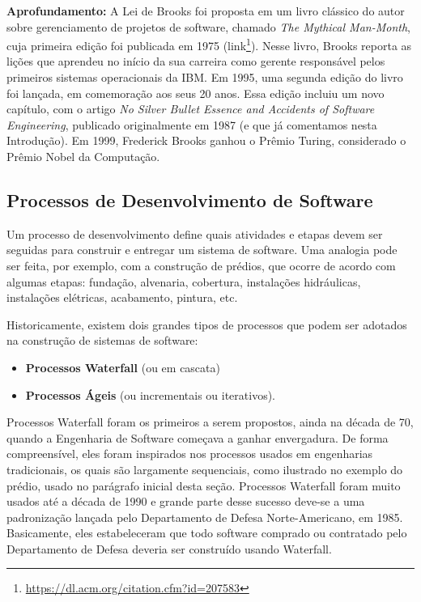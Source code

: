 \documentclass[
  11pt,
  twoside]{book}
\DeclareRobustCommand{\href}[2]{#2\footnote{\url{#1}}}
\newenvironment{esmbox}{\centering \vspace{1.5ex} \begin{tcolorbox}[breakable, colback=backcolor, width=4.9in]}{\end{tcolorbox} \vspace{1.5ex}}
\begin{document}
\begin{esmbox}

\textbf{Aprofundamento:} A Lei de Brooks foi proposta em um livro
clássico do autor sobre gerenciamento de projetos de software, chamado
\emph{The Mythical Man-Month}, cuja primeira edição foi publicada em
1975 (\href{https://dl.acm.org/citation.cfm?id=207583}{link}). Nesse
livro, Brooks reporta as lições que aprendeu no início da sua carreira
como gerente responsável pelos primeiros sistemas operacionais da IBM.
Em 1995, uma segunda edição do livro foi lançada, em comemoração aos
seus 20 anos. Essa edição incluiu um novo capítulo, com o artigo
\emph{No Silver Bullet Essence and Accidents of Software Engineering},
publicado originalmente em 1987 (e que já comentamos nesta Introdução).
Em 1999, Frederick Brooks ganhou o Prêmio Turing, considerado o Prêmio
Nobel da Computação.

\end{esmbox}

\hypertarget{processos-de-desenvolvimento-de-software}{%
\subsection{Processos de Desenvolvimento de
Software}\label{processos-de-desenvolvimento-de-software}}

 Um processo de desenvolvimento define
quais atividades e etapas devem ser seguidas para construir e entregar
um sistema de software. Uma analogia pode ser feita, por exemplo, com a
construção de prédios, que ocorre de acordo com algumas etapas:
fundação, alvenaria, cobertura, instalações hidráulicas, instalações
elétricas, acabamento, pintura, etc.

Historicamente, existem dois grandes tipos de processos que podem ser
adotados na construção de sistemas de software:

\begin{itemize}
\item
  \textbf{Processos Waterfall} (ou em cascata)
\item
  \textbf{Processos Ágeis} (ou incrementais ou iterativos).
\end{itemize}

 Processos Waterfall foram os primeiros a serem
propostos, ainda na década de 70, quando a Engenharia de Software
começava a ganhar envergadura. De forma compreensível, eles foram
inspirados nos processos usados em engenharias tradicionais, os quais
são largamente sequenciais, como ilustrado no exemplo do prédio, usado
no parágrafo inicial desta seção. Processos Waterfall foram muito usados
até a década de 1990 e grande parte desse sucesso deve-se a uma
padronização lançada pelo Departamento de Defesa Norte-Americano, em
1985. Basicamente, eles estabeleceram que todo software comprado ou
contratado pelo Departamento de Defesa deveria ser construído usando
Waterfall.
\end{document}
